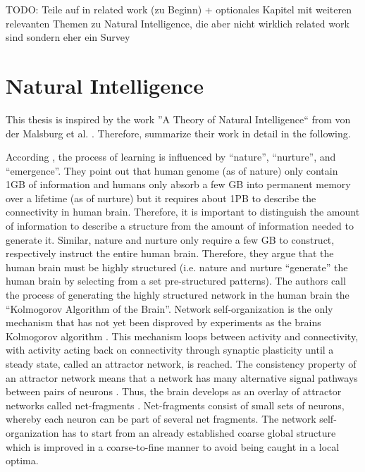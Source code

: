 
TODO: Teile auf in related work (zu Beginn) + optionales Kapitel mit weiteren relevanten Themen zu Natural Intelligence, die aber nicht wirklich related work sind sondern eher ein Survey

\section{Natural Intelligence}
This thesis is inspired by the work ''A Theory of Natural Intelligence`` from von der Malsburg et al. .
Therefore, summarize their work in detail in the following.

According \cite{von_der_Malsburg_Stadelmann_Grewe_2022}, the process of learning is influenced by ``nature'', ``nurture'', and ``emergence''.
They point out that human genome (as of nature) only contain 1GB of information  and humans only absorb a few GB into permanent memory over a lifetime (as of nurture) but it requires about 1PB to describe the connectivity in human brain.
Therefore, it is important to distinguish the amount of information to describe a structure from the amount of information needed to generate it.
Similar, nature and nurture only require a few GB to construct, respectively instruct the entire human brain.
Therefore, they argue that the human brain must be highly structured (i.e. nature and nurture ``generate'' the human brain by selecting from a set pre-structured patterns).
The authors call the process of generating the highly structured network in the human brain the ``Kolmogorov  Algorithm of the Brain''.
Network self-organization is the only mechanism that has not yet been disproved by experiments as the brains Kolmogorov algorithm .
This mechanism loops between activity and connectivity, with activity acting back on connectivity through synaptic plasticity until a steady state, called an attractor network, is reached.
The consistency property of an attractor network means that a network has many alternative signal pathways between pairs of neurons .
Thus, the brain develops as an overlay of attractor networks called net-fragments .
Net-fragments consist of small sets of neurons, whereby each neuron can be part of several net fragments.
The network self-organization has to start from an already established coarse global structure which is improved in a coarse-to-fine manner to avoid being caught in a local optima.


